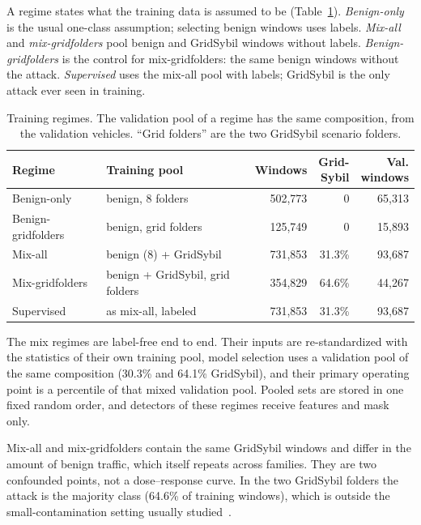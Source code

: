 A regime states what the training data is assumed to be (Table~\ref{tab:regimes}).
\emph{Benign-only} is the usual one-class assumption; selecting benign windows uses labels.
\emph{Mix-all} and \emph{mix-gridfolders} pool benign and GridSybil windows without labels.
\emph{Benign-gridfolders} is the control for mix-gridfolders: the same benign windows without the attack.
\emph{Supervised} uses the mix-all pool with labels; GridSybil is the only attack ever seen in training.

\begin{table}[t]
\caption{Training regimes. The validation pool of a regime has the same composition, from the validation
vehicles. ``Grid folders'' are the two GridSybil scenario folders.}
\label{tab:regimes}
\centering
\footnotesize
\setlength{\tabcolsep}{3pt}
\begin{tabular}{@{}p{1.9cm}p{2.55cm}rrr@{}}
\toprule
Regime & Training pool & Windows & \shortstack[r]{Grid-\\Sybil} & \shortstack[r]{Val.\\windows} \\
\midrule
Benign-only        & benign, 8 folders          & 502{,}773 & 0      & 65{,}313 \\
Benign-gridfolders & benign, grid folders       & 125{,}749 & 0      & 15{,}893 \\
Mix-all            & benign (8) + GridSybil     & 731{,}853 & 31.3\% & 93{,}687 \\
Mix-gridfolders    & benign + GridSybil, grid folders & 354{,}829 & 64.6\% & 44{,}267 \\
Supervised         & as mix-all, labeled        & 731{,}853 & 31.3\% & 93{,}687 \\
\bottomrule
\end{tabular}
\end{table}

The mix regimes are label-free end to end. Their inputs are re-standardized with the statistics of their own
training pool, model selection uses a validation pool of the same composition (30.3\% and 64.1\% GridSybil), and
their primary operating point is a percentile of that mixed validation pool. Pooled sets are stored in one fixed
random order, and detectors of these regimes receive features and mask only.

Mix-all and mix-gridfolders contain the same GridSybil windows and differ in the amount of benign traffic, which
itself repeats across families. They are two confounded points, not a dose--response curve. In the two GridSybil
folders the attack is the majority class (64.6\% of training windows), which is outside the small-contamination
setting usually studied~\cite{zhou2017anomaly,qiu2022latent}.

